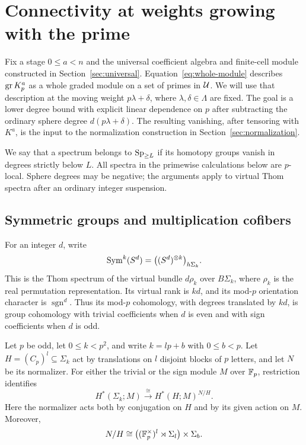 \section{Connectivity at weights growing with the prime}
\label{sec:connectivity}

Fix a stage $0\leq a<n$ and the universal coefficient algebra and
finite-cell module constructed in Section~\ref{sec:universal}.
Equation~\eqref{eq:whole-module} describes $\operatorname{gr} K_p^a$ as a whole
graded module on a set of primes in $\mathcal U$. We will use that description
at the moving weight $p\lambda+\delta$, where $\lambda,\delta\in\Lambda$
are fixed. The goal is a lower degree bound with explicit linear
dependence on $p$ after subtracting the ordinary sphere degree
$d(p\lambda+\delta)$.
The resulting vanishing, after tensoring with $K^a$, is the input to
the normalization construction in Section~\ref{sec:normalization}.

We say that a spectrum belongs to $\mathrm{Sp}_{\geq L}$ if its homotopy
groups vanish in degrees strictly below $L$. All spectra in the
primewise calculations below are $p$-local. Sphere degrees may be
negative; the arguments apply to virtual Thom spectra after an
ordinary integer suspension.

\subsection{Symmetric groups and multiplication cofibers}

For an integer $d$, write
\[
 \operatorname{Sym}^k(S^d)=\big((S^d)^{\otimes k}\big)_{h\Sigma_k}.
\]
This is the Thom spectrum of the virtual bundle $d\rho_k$ over
$B\Sigma_k$, where $\rho_k$ is the real permutation representation.
Its virtual rank is $kd$, and its mod-$p$ orientation character is
$\operatorname{sgn}^d$. Thus its mod-$p$ cohomology, with degrees
translated by $kd$, is group cohomology with trivial coefficients
when $d$ is even and with sign coefficients when $d$ is odd.

\begin{lemma}\label{conn:stable-elements}
Let $p$ be odd, let $0\leq k<p^2$, and write $k=lp+b$ with
$0\leq b<p$. Let $H=(C_p)^l\subseteq\Sigma_k$ act by translations
on $l$ disjoint blocks of $p$ letters, and let $N$ be its normalizer.
For either the trivial or the sign module $M$ over $\mathbb F_p$, restriction
identifies
\[
 H^*(\Sigma_k;M)
 \xrightarrow{\ \cong\ }
 H^*(H;M)^{N/H}.
\]
Here the normalizer acts both by conjugation on $H$ and by its given
action on $M$. Moreover,
\[
 N/H\cong
 \big((\mathbb F_p^\times)^l\rtimes\Sigma_l\big)\times\Sigma_b.
\]
\end{lemma}

